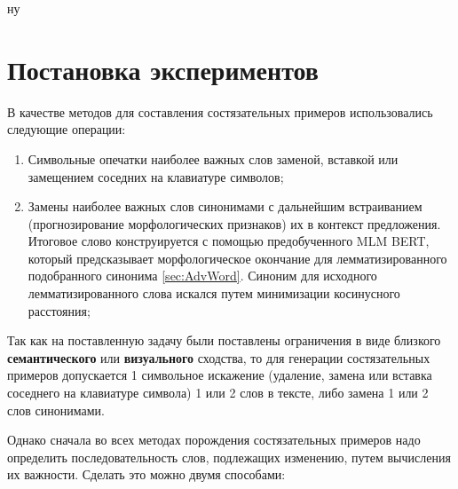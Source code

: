 ну\section{Постановка экспериментов}
\label{sec:Optimization} 

\noindent\hspace{0.6cm} В качестве методов для составления состязательных примеров  использовались следующие операции:
\begin{enumerate}
    \item Символьные опечатки наиболее важных слов заменой, вставкой или замещением соседних на клавиатуре символов;
    \item Замены наиболее важных слов синонимами с дальнейшим встраиванием (прогнозирование морфологических признаков) их в контекст предложения. Итоговое слово конструируется с помощью предобученного MLM BERT, который предсказывает морфологическое окончание для лемматизированного подобранного синонима \ref{sec:AdvWord}. Синоним для исходного лемматизированного слова искался путем минимизации косинусного расстояния;
\end{enumerate} Так как на поставленную задачу были поставлены ограничения в виде близкого \textbf{семантического} или \textbf{визуального} сходства, то для генерации состязательных примеров допускается 1 символьное искажение (удаление, замена или вставка соседнего на клавиатуре символа) 1 или 2 слов в тексте, либо замена 1 или 2 слов синонимами.

\noindent\hspace{0.6cm}Однако сначала во всех методах порождения состязательных примеров надо определить последовательность слов, подлежащих изменению, путем вычисления их важности. Сделать это можно двумя способами:

